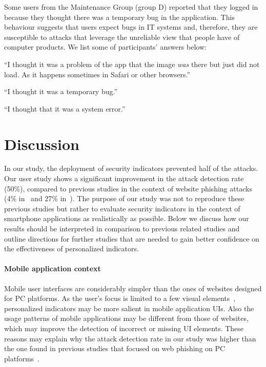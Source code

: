 Some users from the Maintenance Group (group D) reported that they logged in because they thought there was a temporary bug in the application.
This behaviour suggests that users expect bugs in IT systems and, therefore, they are susceptible to attacks that leverage the unreliable view that people have of computer products.
We list some of participants' answers below:

\begin{myquote}
  ``I thought it was a problem of the app that the image \emph{was} there but
  just did not load. As it happens sometimes in Safari or other browsers.''
\end{myquote}
\begin{myquote}
  ``I thought it was a temporary bug.''
\end{myquote}
\begin{myquote}
  ``I thought that it was a system error.''
\end{myquote}

\section{Discussion}
\label{sec:sp_phishing_discussion}

In our study, the deployment of security indicators prevented half of the attacks.
Our user study shows a significant improvement in the attack detection rate (50\%), compared to previous studies in the context of website phishing attacks (4\% in~\cite{schechter07sp} and 27\% in~\cite{lee-w2sp14}).
The purpose of our study was not to reproduce these previous studies but rather to evaluate security indicators in the context of smartphone applications as realistically as possible.
Below we discuss how our results should be interpreted in comparison to previous related studies and outline directions for further studies that are needed to gain better confidence on the effectiveness of personalized indicators.

\paragraph{Mobile application context}
Mobile user interfaces are considerably simpler than the ones of websites designed for PC platforms. As the user's focus is limited to a few visual elements~\cite{rensink2002}, personalized indicators may be more salient in mobile application UIs. Also the usage patterns of mobile applications may be different from those of websites, which may improve the detection of incorrect or missing UI elements.
These reasons may explain why the attack detection rate in our study was higher than the one found in previous studies that focused on web phishing on PC platforms~\cite{schechter07sp,lee-w2sp14}.


